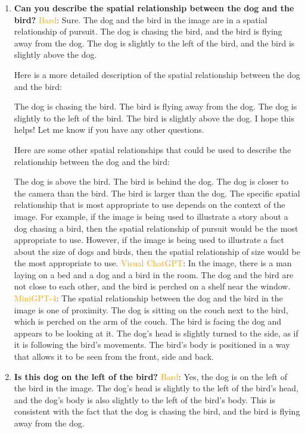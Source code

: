     \begin{enumerate}
        \item \textbf{Can you describe the spatial relationship between the dog and the bird?}
        \subitem \textcolor{orange}{Bard}: 
        Sure. The dog and the bird in the image are in a spatial relationship of pursuit. The dog is chasing the bird, and the bird is flying away from the dog. The dog is slightly to the left of the bird, and the bird is slightly above the dog.

        Here is a more detailed description of the spatial relationship between the dog and the bird:

        The dog is chasing the bird.
        The bird is flying away from the dog.
        The dog is slightly to the left of the bird.
        The bird is slightly above the dog.
        I hope this helps! Let me know if you have any other questions.

        Here are some other spatial relationships that could be used to describe the relationship between the dog and the bird:

        The dog is above the bird.
        The bird is behind the dog.
        The dog is closer to the camera than the bird.
        The bird is larger than the dog.
        The specific spatial relationship that is most appropriate to use depends on the context of the image. For example, if the image is being used to illustrate a story about a dog chasing a bird, then the spatial relationship of pursuit would be the most appropriate to use. However, if the image is being used to illustrate a fact about the size of dogs and birds, then the spatial relationship of size would be the most appropriate to use.
        \subitem \textcolor{orange}{Visual ChatGPT}: In the image, there is a man laying on a bed and a dog and a bird in the room. The dog and the bird are not close to each other, and the bird is perched on a shelf near the window.
        \subitem \textcolor{orange}{MiniGPT-4}: The spatial relationship between the dog and the bird in the image is one of proximity. The dog is sitting on the couch next to the bird, which is perched on the arm of the couch. The bird is facing the dog and appears to be looking at it. The dog’s head is slightly turned to the side, as if it is following the bird’s movements. The bird’s body is positioned in a way that allows it to be seen from the front, side and back.
        \item \textbf{Is this dog on the left of the bird?}
        \subitem \textcolor{orange}{Bard}: Yes, the dog is on the left of the bird in the image. The dog's head is slightly to the left of the bird's head, and the dog's body is also slightly to the left of the bird's body. This is consistent with the fact that the dog is chasing the bird, and the bird is flying away from the dog.


\end{enumerate}
